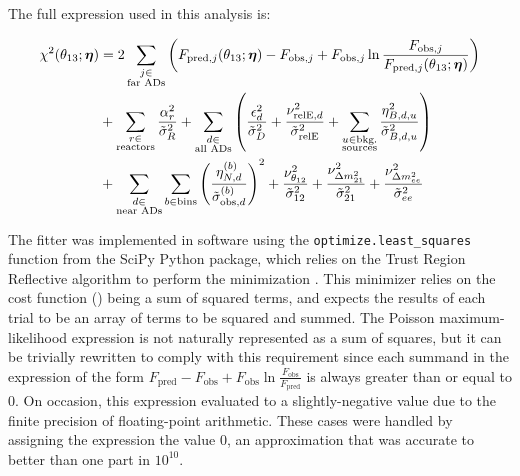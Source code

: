 The full \chisquare{} expression used in this analysis is:

\begin{align}\label{eq:chisquare_full}
    \begin{split}
        \chi^2(\theta_{13};\boldsymbol{\eta}) &=
            2\sum_{\substack{j \in \\\text{far ADs}}}
        \left(
            F_{\text{pred},j}(\theta_{13};\boldsymbol{\eta}) - F_{\text{obs},j}
            + F_{\text{obs},j}\ln
            \frac{F_{\text{obs},j}}{F_{\text{pred},j}(\theta_{13};\boldsymbol{\eta})}
        \right) \\
            &+ \sum_{\substack{r \in \\\text{reactors}}}
                \frac{\alpha_r^2}{\tilde{\sigma}_R^2}
            + \sum_{\substack{d \in \\\text{all ADs}}}
            \left(
                \frac{\epsilon_d^2}{\tilde{\sigma}_D^2}
                + \frac{\nu_{\text{relE},d}^2}{\tilde{\sigma}_{\text{relE}}^2}
                + \sum_{\substack{u \in \text{bkg.}\\\text{sources}}}
                \frac{\eta_{B,d,u}^2}{\tilde{\sigma}_{B,d,u}^2}
            \right) \\
            &+ \sum_{\substack{d \in \\\text{near ADs}}}
            \sum_{b \in \text{bins}}
            \left(\frac{\eta_{N,d}^{(b)}}{\tilde{\sigma}_{\text{obs},d}^{(b)}}
            \right)^2
            + \frac{\nu_{\theta_{12}}^2}{\tilde{\sigma}_{12}^2}
            + \frac{\nu_{\Delta m^2_{21}}^2}{\tilde{\sigma}_{21}^2}
            + \frac{\nu_{\Delta m^2_{ee}}^2}{\tilde{\sigma}_{ee}^2}
    \end{split}
\end{align}

The fitter was implemented in software using the
\texttt{optimize.least\_squares} function from the SciPy Python package,
which relies on the Trust Region Reflective algorithm
to perform the \chisquare{} minimization \cite{scipy,trf_minimizer}.
This minimizer relies on the cost function (\chisquare{})
being a sum of squared terms,
and expects the results of each trial
to be an array of terms to be squared and summed.
The Poisson maximum-likelihood \chisquare{} expression
is not naturally represented as a sum of squares,
but it can be trivially rewritten to comply with this requirement
since each summand in the \chisquare{} expression of the form
$F_\text{pred}-F_\text{obs}+F_\text{obs}\ln\frac{F_\text{obs}}{F_\text{pred}}$
is always greater than or equal to 0.
On occasion, this expression evaluated to a slightly-negative value
due to the finite precision of floating-point arithmetic.
These cases were handled by assigning the expression the value 0,
an approximation that was accurate to better than one part in $10^{10}$.

